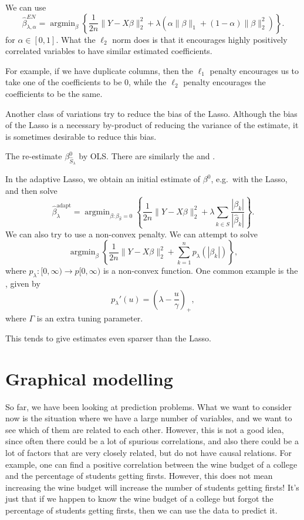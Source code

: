 \documentclass[a4paper]{article}
\DeclareMathOperator*\argmin{argmin}
\begin{document}
\begin{eg}
  We can use
  \[
    \hat{\beta}_{\lambda, \alpha}^{EN} = \argmin_{\beta} \left\{\frac{1}{2n} \|Y - X \beta\|_2^2 + \lambda (\alpha \|\beta\|_1 + (1 - \alpha)\|\beta\|_2^2)\right\}.
  \]
  for $\alpha \in [0, 1]$. What the $\ell_2$ norm does is that it encourages highly positively correlated variables to have similar estimated coefficients.

  For example, if we have duplicate columns, then the $\ell_1$ penalty encourages us to take one of the coefficients to be $0$, while the $\ell_2$ penalty encourages the coefficients to be the same. 
\end{eg}

Another class of variations try to reduce the bias of the Lasso. Although the bias of the Lasso is a necessary by-product of reducing the variance of the estimate, it is sometimes desirable to reduce this bias.

The  re-estimate $\beta^0_{\hat{S}_\lambda}$ by OLS. There are similarly the  and .

In the adaptive Lasso, we obtain an initial estimate of $\beta^0$, e.g.\ with the Lasso, and then solve
\[
  \hat{\beta}^{\mathrm{adapt}}_\lambda = \argmin_{\beta : \beta_{\hat{S}} = 0} \left\{\frac{1}{2n} \|Y - X \beta\|_2^2 + \lambda \sum_{k \in \hat{S}} \frac{|\beta_k|}{|\hat{\beta}_k|}\right\}.
\]
We can also try to use a non-convex penalty. We can attempt to solve
\[
  \argmin_\beta \left\{\frac{1}{2n} \|Y - X \beta\|_2^2 + \sum_{k = 1}^n p_\lambda(|\beta_k|)\right\},
\]
where $p_\lambda: [0, \infty) \to p[0, \infty)$ is a non-convex function. One common example is the , given by
\[
  p_\lambda'(u) = \left(\lambda - \frac{u}{\gamma}\right)_+,
\]
where $\Gamma$ is an extra tuning parameter.


This tends to give estimates even sparser than the Lasso.

\section{Graphical modelling}
So far, we have been looking at prediction problems. What we want to consider now is the situation where we have a large number of variables, and we want to see which of them are related to each other. However, this is not a good idea, since often there could be a lot of spurious correlations, and also there could be a lot of factors that are very closely related, but do not have causal relations. For example, one can find a positive correlation between the wine budget of a college and the percentage of students getting firsts. However, this does not mean increasing the wine budget will increase the number of students getting firsts! It's just that if we happen to know the wine budget of a college but forgot the percentage of students getting firsts, then we can use the data to predict it.
\end{document}
